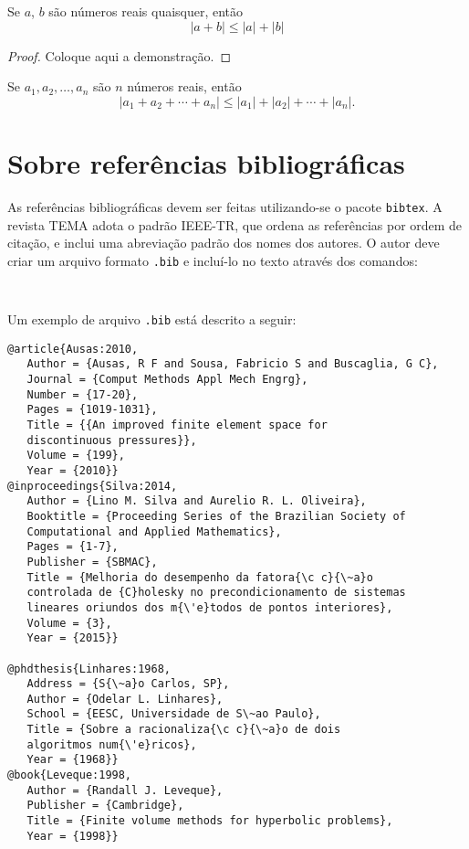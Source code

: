 \documentclass{TEMA}
\begin{document}
\begin{itemize}
\begin{framed}
\begin{teoTEMA}
\label{teoDT}
Se $a$, $b$ são números reais quaisquer, então
\[ |a+b| \leq |a| + |b| \]
\end{teoTEMA}
\begin{proof}
Coloque aqui a demonstração.
\end{proof}
\begin{coroTEMAp}
Se $a_1, a_2, \ldots, a_n$ são $n$ números reais, então
\[ |a_1+a_2+\cdots+a_n| \leq |a_1|+|a_2|+\cdots+|a_n|. \]
\end{coroTEMAp}
\end{framed}

\end{itemize}



\section{Sobre referências bibliográficas}

As referências bibliográficas devem ser feitas utilizando-se 
o pacote \texttt{bibtex}. A revista TEMA adota o padrão IEEE-TR,
que ordena as referências por ordem de citação, e inclui 
uma abreviação padrão dos nomes dos autores. O autor deve 
criar um arquivo formato \texttt{.bib} e incluí-lo no texto
através dos comandos:

\begin{framed}
\begin{verbatim}


\end{verbatim}
\end{framed}

Um exemplo de arquivo \texttt{.bib} está descrito a seguir:
\begin{framed}
\begin{verbatim}
@article{Ausas:2010,
   Author = {Ausas, R F and Sousa, Fabricio S and Buscaglia, G C},
   Journal = {Comput Methods Appl Mech Engrg},
   Number = {17-20},
   Pages = {1019-1031},
   Title = {{An improved finite element space for 
   discontinuous pressures}},
   Volume = {199},
   Year = {2010}}
@inproceedings{Silva:2014,
   Author = {Lino M. Silva and Aurelio R. L. Oliveira},
   Booktitle = {Proceeding Series of the Brazilian Society of
   Computational and Applied Mathematics},
   Pages = {1-7},
   Publisher = {SBMAC},
   Title = {Melhoria do desempenho da fatora{\c c}{\~a}o 
   controlada de {C}holesky no precondicionamento de sistemas 
   lineares oriundos dos m{\'e}todos de pontos interiores},
   Volume = {3},
   Year = {2015}}
   
@phdthesis{Linhares:1968,
   Address = {S{\~a}o Carlos, SP},
   Author = {Odelar L. Linhares},
   School = {EESC, Universidade de S\~ao Paulo},
   Title = {Sobre a racionaliza{\c c}{\~a}o de dois 
   algoritmos num{\'e}ricos},
   Year = {1968}}
@book{Leveque:1998,
   Author = {Randall J. Leveque},
   Publisher = {Cambridge},
   Title = {Finite volume methods for hyperbolic problems},
   Year = {1998}}
\end{verbatim}
\end{framed}
\end{document}
